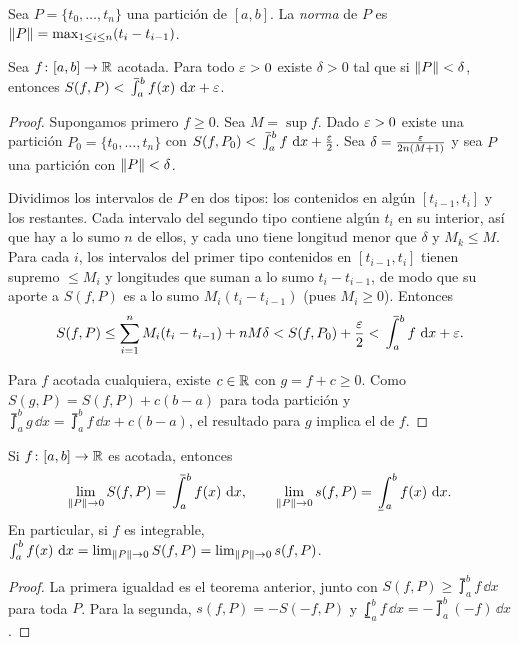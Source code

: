 \begin{definition}
  Sea \(P = \{ t_0, \dots, t_n \}\) una partición de \([a, b]\). La \emph{norma} de \(P\) es \(\left\lVert P \right\rVert = \max_{1 \leq i \leq n} (t_i - t_{i-1})\).
\end{definition}

\begin{theorem}
  Sea \(f\colon [a, b] \to \mathbb{R}\) acotada. Para todo \(\varepsilon > 0\) existe \(\delta > 0\) tal que si \(\left\lVert P \right\rVert < \delta\), entonces \(S(f, P) < \upint_a^b f(x) \,\dd x + \e\).
\end{theorem}

\begin{proof}
  Supongamos primero \(f \geq 0\). Sea \(M = \sup f\). Dado \(\varepsilon > 0\) existe una partición \(P_0 = \{ t_0, \dots, t_n \}\) con \(S(f, P_0) < \upint_a^b f \,\dd x + \frac{\e}{2}\). Sea \(\delta = \frac{\varepsilon}{2n (M + 1)}\) y sea \(P\) una partición con \(\left\lVert P \right\rVert < \delta\).

  Dividimos los intervalos de \(P\) en dos tipos: los contenidos en algún \([t_{i-1}, t_i]\) y los restantes. Cada intervalo del segundo tipo contiene algún \(t_i\) en su interior, así que hay a lo sumo \(n\) de ellos, y cada uno tiene longitud menor que \(\delta\) y \(M_k \leq M\). Para cada \(i\), los intervalos del primer tipo contenidos en \([t_{i-1}, t_i]\) tienen supremo \(\leq M_i\) y longitudes que suman a lo sumo \(t_i - t_{i-1}\), de modo que su aporte a \(S(f, P)\) es a lo sumo \(M_i (t_i - t_{i-1})\) (pues \(M_i \geq 0\)). Entonces
  \[
    S(f, P) \leq \sum_{i=1}^{n} M_i (t_i - t_{i-1}) + n M \delta < S(f, P_0) + \frac{\e}{2} < \upint_a^b f \,\dd x + \e.
  \]

  Para \(f\) acotada cualquiera, existe \(c \in \mathbb{R}\) con \(g = f + c \geq 0\). Como \(S(g, P) = S(f, P) + c(b - a)\) para toda partición y \(\upint_a^b g \,\dd x = \upint_a^b f \,\dd x + c(b - a)\), el resultado para \(g\) implica el de \(f\).
\end{proof}

\begin{corollary}
  Si \(f\colon [a, b] \to \mathbb{R}\) es acotada, entonces
  \[
    \lim_{\norm{P} \to 0} S(f, P) = \upint_a^b f(x) \,\dd x, \qquad \lim_{\norm{P} \to 0} s(f, P) = \lowint_a^b f(x) \,\dd x.
  \]
  En particular, si \(f\) es integrable, \(\int_a^b f(x) \,\mathop{}\!\mathrm{d} x = \lim_{\left\lVert P \right\rVert \to 0} S(f, P) = \lim_{\left\lVert P \right\rVert \to 0} s(f, P)\).
\end{corollary}

\begin{proof}
  La primera igualdad es el teorema anterior, junto con \(S(f, P) \geq \upint_a^b f \,\dd x\) para toda \(P\). Para la segunda, \(s(f, P) = -S(-f, P)\) y \(\lowint_a^b f \,\dd x = -\upint_a^b (-f) \,\dd x\).
\end{proof}

